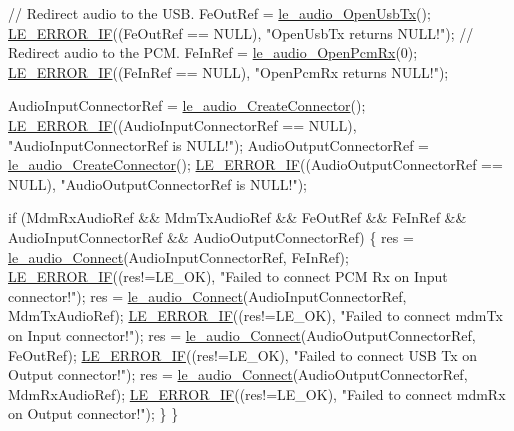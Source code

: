 \begin{DoxyCodeInclude}
{{{{{{{{{{{    \textcolor{comment}{// Redirect audio to the USB.}
    FeOutRef = \hyperlink{le__audio__interface_8h_adb38f11ac78cf99160c19f69b4db0eb8}{le\_audio\_OpenUsbTx}();
    \hyperlink{le__log_8h_aceaf11a11691d6c676e36dd317b38dbd}{LE\_ERROR\_IF}((FeOutRef == NULL), \textcolor{stringliteral}{"OpenUsbTx returns NULL!"});
    \textcolor{comment}{// Redirect audio to the PCM.}
    FeInRef = \hyperlink{le__audio__interface_8h_aa0f0b5fcab8844c67a936d88fa050cf5}{le\_audio\_OpenPcmRx}(0);
    \hyperlink{le__log_8h_aceaf11a11691d6c676e36dd317b38dbd}{LE\_ERROR\_IF}((FeInRef == NULL), \textcolor{stringliteral}{"OpenPcmRx returns NULL!"});

    AudioInputConnectorRef = \hyperlink{le__audio__interface_8h_a570aaf85086f00aca592acfbaaa237be}{le\_audio\_CreateConnector}();
    \hyperlink{le__log_8h_aceaf11a11691d6c676e36dd317b38dbd}{LE\_ERROR\_IF}((AudioInputConnectorRef == NULL), \textcolor{stringliteral}{"AudioInputConnectorRef is NULL!"});
    AudioOutputConnectorRef = \hyperlink{le__audio__interface_8h_a570aaf85086f00aca592acfbaaa237be}{le\_audio\_CreateConnector}();
    \hyperlink{le__log_8h_aceaf11a11691d6c676e36dd317b38dbd}{LE\_ERROR\_IF}((AudioOutputConnectorRef == NULL), \textcolor{stringliteral}{"AudioOutputConnectorRef is NULL!"});

    \textcolor{keywordflow}{if} (MdmRxAudioRef && MdmTxAudioRef && FeOutRef && FeInRef &&
        AudioInputConnectorRef && AudioOutputConnectorRef)
    \{
        res = \hyperlink{le__audio__interface_8h_a338df65b2fb1ae0140d86880adbcf0de}{le\_audio\_Connect}(AudioInputConnectorRef, FeInRef);
        \hyperlink{le__log_8h_aceaf11a11691d6c676e36dd317b38dbd}{LE\_ERROR\_IF}((res!=LE\_OK), \textcolor{stringliteral}{"Failed to connect PCM Rx on Input connector!"});
        res = \hyperlink{le__audio__interface_8h_a338df65b2fb1ae0140d86880adbcf0de}{le\_audio\_Connect}(AudioInputConnectorRef, MdmTxAudioRef);
        \hyperlink{le__log_8h_aceaf11a11691d6c676e36dd317b38dbd}{LE\_ERROR\_IF}((res!=LE\_OK), \textcolor{stringliteral}{"Failed to connect mdmTx on Input connector!"});
        res = \hyperlink{le__audio__interface_8h_a338df65b2fb1ae0140d86880adbcf0de}{le\_audio\_Connect}(AudioOutputConnectorRef, FeOutRef);
        \hyperlink{le__log_8h_aceaf11a11691d6c676e36dd317b38dbd}{LE\_ERROR\_IF}((res!=LE\_OK), \textcolor{stringliteral}{"Failed to connect USB Tx on Output connector!"});
        res = \hyperlink{le__audio__interface_8h_a338df65b2fb1ae0140d86880adbcf0de}{le\_audio\_Connect}(AudioOutputConnectorRef, MdmRxAudioRef);
        \hyperlink{le__log_8h_aceaf11a11691d6c676e36dd317b38dbd}{LE\_ERROR\_IF}((res!=LE\_OK), \textcolor{stringliteral}{"Failed to connect mdmRx on Output connector!"});
    \}
\}

}}}}}}}}}}}
\end{DoxyCodeInclude}
